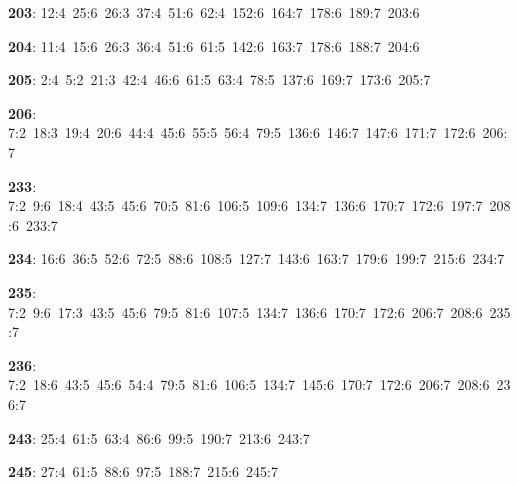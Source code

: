 \noindent \textbf{203}: 12:4\allowbreak\ 25:6\allowbreak\ 26:3\allowbreak\ 37:4\allowbreak\ 51:6\allowbreak\ 62:4\allowbreak\ 152:6\allowbreak\ 164:7\allowbreak\ 178:6\allowbreak\ 189:7\allowbreak\ 203:6\par
\noindent \textbf{204}: 11:4\allowbreak\ 15:6\allowbreak\ 26:3\allowbreak\ 36:4\allowbreak\ 51:6\allowbreak\ 61:5\allowbreak\ 142:6\allowbreak\ 163:7\allowbreak\ 178:6\allowbreak\ 188:7\allowbreak\ 204:6\par
\noindent \textbf{205}: 2:4\allowbreak\ 5:2\allowbreak\ 21:3\allowbreak\ 42:4\allowbreak\ 46:6\allowbreak\ 61:5\allowbreak\ 63:4\allowbreak\ 78:5\allowbreak\ 137:6\allowbreak\ 169:7\allowbreak\ 173:6\allowbreak\ 205:7\par
\noindent \textbf{206}: 7:2\allowbreak\ 18:3\allowbreak\ 19:4\allowbreak\ 20:6\allowbreak\ 44:4\allowbreak\ 45:6\allowbreak\ 55:5\allowbreak\ 56:4\allowbreak\ 79:5\allowbreak\ 136:6\allowbreak\ 146:7\allowbreak\ 147:6\allowbreak\ 171:7\allowbreak\ 172:6\allowbreak\ 206:7\par
\noindent \textbf{233}: 7:2\allowbreak\ 9:6\allowbreak\ 18:4\allowbreak\ 43:5\allowbreak\ 45:6\allowbreak\ 70:5\allowbreak\ 81:6\allowbreak\ 106:5\allowbreak\ 109:6\allowbreak\ 134:7\allowbreak\ 136:6\allowbreak\ 170:7\allowbreak\ 172:6\allowbreak\ 197:7\allowbreak\ 208:6\allowbreak\ 233:7\par
\noindent \textbf{234}: 16:6\allowbreak\ 36:5\allowbreak\ 52:6\allowbreak\ 72:5\allowbreak\ 88:6\allowbreak\ 108:5\allowbreak\ 127:7\allowbreak\ 143:6\allowbreak\ 163:7\allowbreak\ 179:6\allowbreak\ 199:7\allowbreak\ 215:6\allowbreak\ 234:7\par
\noindent \textbf{235}: 7:2\allowbreak\ 9:6\allowbreak\ 17:3\allowbreak\ 43:5\allowbreak\ 45:6\allowbreak\ 79:5\allowbreak\ 81:6\allowbreak\ 107:5\allowbreak\ 134:7\allowbreak\ 136:6\allowbreak\ 170:7\allowbreak\ 172:6\allowbreak\ 206:7\allowbreak\ 208:6\allowbreak\ 235:7\par
\noindent \textbf{236}: 7:2\allowbreak\ 18:6\allowbreak\ 43:5\allowbreak\ 45:6\allowbreak\ 54:4\allowbreak\ 79:5\allowbreak\ 81:6\allowbreak\ 106:5\allowbreak\ 134:7\allowbreak\ 145:6\allowbreak\ 170:7\allowbreak\ 172:6\allowbreak\ 206:7\allowbreak\ 208:6\allowbreak\ 236:7\par
\noindent \textbf{243}: 25:4\allowbreak\ 61:5\allowbreak\ 63:4\allowbreak\ 86:6\allowbreak\ 99:5\allowbreak\ 190:7\allowbreak\ 213:6\allowbreak\ 243:7\par
\noindent \textbf{245}: 27:4\allowbreak\ 61:5\allowbreak\ 88:6\allowbreak\ 97:5\allowbreak\ 188:7\allowbreak\ 215:6\allowbreak\ 245:7\par

